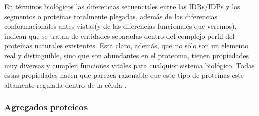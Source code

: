En términos biológicos las diferencias secuenciales entre las IDRs/IDPs y los segmentos o proteínas totalmente plegadas, además de las diferencias conformacionales antes vistas(y de las diferencias funcionales que veremos), 
indican que se tratan de entidades separadas dentro del complejo perfil del proteínas naturales existentes.
Esta claro, además, que no sólo son un elemento real y distinguible, sino que son abundantes en el proteoma, tienen propiedades muy diversas y cumplen funciones vitales para cualquier sistema biológico.
Todas estas propiedades hacen que parezca razonable que este tipo de proteínas este altamente regulada dentro de la célula \cite{gsponer2008tight,habchi2014introducing}.






















\subsubsection{Agregados proteicos}


